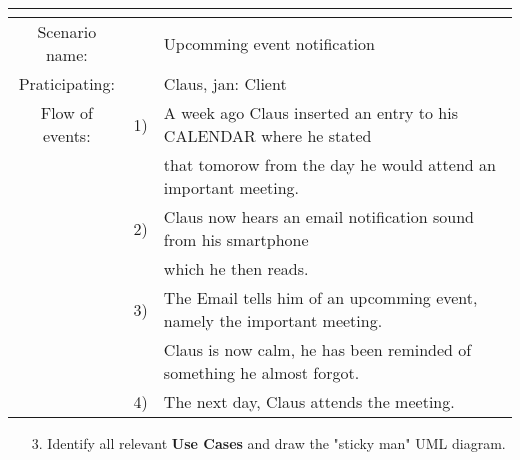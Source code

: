 \documentclass{article}
\begin{document}
\begin{tabular}{c r @{} l}
	\multicolumn{2}{c}{} \\
	\hline
	Scenario name:	&&Upcomming event notification\\
	\hline
	Praticipating:		&&Claus, jan: Client \\
	\hline
	Flow of events:	&1)&A week ago Claus inserted an entry to his CALENDAR where he stated\\ 
					&&that tomorow from the day he would attend an important meeting.\\
				&2)&Claus now hears an email notification sound from his smartphone\\ 
					&&which he then reads.\\
				&3)&The Email tells him of an upcomming event, namely the important meeting.\\ 
					&&Claus is now calm, he has been reminded of something he almost forgot.\\
				&4)&The next day, Claus attends the meeting.\\
	\hline
\end{tabular}




	\begin{enumerate}
		\item[3.] Identify all  relevant \textbf{Use Cases} and draw the "sticky man" UML diagram.

	\end{enumerate}
\end{document}
